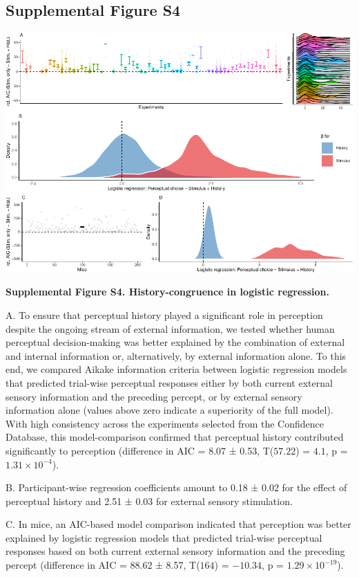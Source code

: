 \documentclass[
]{article}
\begin{document}
\newpage

\hypertarget{supplemental-figure-s4}{%
\subsection{Supplemental Figure S4}\label{supplemental-figure-s4}}

\includegraphics{modes_mouse_files/figure-latex/Supplememtal_Figure_S4-1.pdf}

\textbf{Supplemental Figure S4. History-congruence in logistic
regression.}

A. To ensure that perceptual history played a significant role in
perception despite the ongoing stream of external information, we tested
whether human perceptual decision-making was better explained by the
combination of external and internal information or, alternatively, by
external information alone. To this end, we compared Aikake information
criteria between logistic regression models that predicted trial-wise
perceptual responses either by both current external sensory information
and the preceding percept, or by external sensory information alone
(values above zero indicate a superiority of the full model). With high
consistency across the experiments selected from the Confidence
Database, this model-comparison confirmed that perceptual history
contributed significantly to perception (difference in AIC = 8.07 ±
0.53, T(\(57.22\)) = \(4.1\), p = \(\ensuremath{1.31\times 10^{-4}}\)).

B. Participant-wise regression coefficients amount to 0.18 ± 0.02 for
the effect of perceptual history and 2.51 ± 0.03 for external sensory
stimulation.

C. In mice, an AIC-based model comparison indicated that perception was
better explained by logistic regression models that predicted trial-wise
perceptual responses based on both current external sensory information
and the preceding percept (difference in AIC = 88.62 ± 8.57, T(\(164\))
= \(-10.34\), p = \(\ensuremath{1.29\times 10^{-19}}\)).
\end{document}
